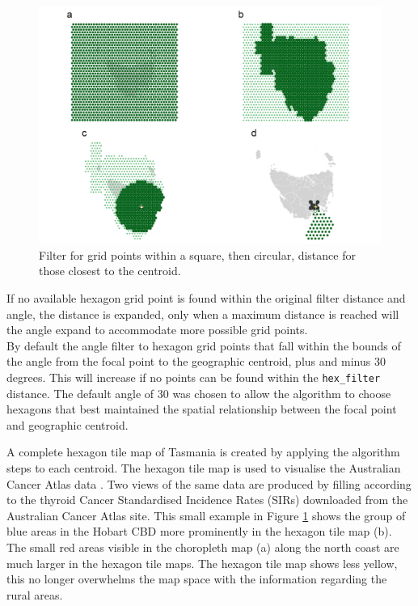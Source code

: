 \begin{Schunk}
\begin{figure}
\includegraphics[width=0.95\linewidth]{kobakian-cook_files/figure-latex/filterprocess-1} \caption[Filter for grid points within a square, then circular, distance for those closest to the centroid]{Filter for grid points within a square, then circular, distance for those closest to the centroid.}\label{fig:filterprocess}
\end{figure}
\end{Schunk}

If no available hexagon grid point is found within the original filter
distance and angle, the distance is expanded, only when a maximum
distance is reached will the angle expand to accommodate more possible
grid points.\\
By default the angle filter to hexagon grid points that fall within the
bounds of the angle from the focal point to the geographic centroid,
plus and minus 30 degrees. This will increase if no points can be found
within the \texttt{hex\_filter} distance. The default angle of 30 was
chosen to allow the algorithm to choose hexagons that best maintained
the spatial relationship between the focal point and geographic
centroid.

A complete hexagon tile map of Tasmania is created by applying the
algorithm steps to each centroid. The hexagon tile map is used to
visualise the Australian Cancer Atlas data \citep{TACA}. Two views of
the same data are produced by filling according to the thyroid Cancer
Standardised Incidence Rates (SIRs) downloaded from the Australian
Cancer Atlas site. This small example in Figure \ref{fig:filterprocess}
shows the group of blue areas in the Hobart CBD more prominently in the
hexagon tile map (b). The small red areas visible in the choropleth map
(a) along the north coast are much larger in the hexagon tile maps. The
hexagon tile map shows less yellow, this no longer overwhelms the map
space with the information regarding the rural areas.

